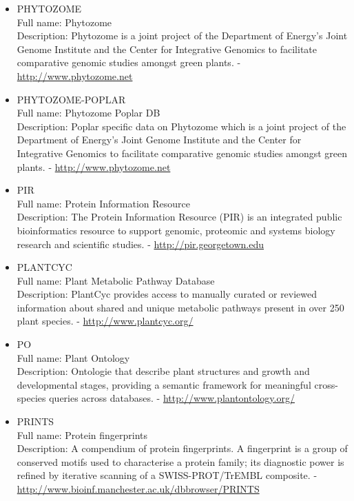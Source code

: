 \begin{itemize}
\item{PHYTOZOME}\\ Full name: Phytozome\\ Description: Phytozome is a joint project of the Department of Energy's Joint Genome Institute and the Center for Integrative Genomics to facilitate comparative genomic studies amongst green plants. - 
\url{http://www.phytozome.net}

\item{PHYTOZOME-POPLAR}\\ Full name: Phytozome Poplar DB\\ Description: Poplar specific data on Phytozome which is a joint project of the Department of Energy's Joint Genome Institute and the Center for Integrative Genomics to facilitate comparative genomic studies amongst green plants. - 
\url{http://www.phytozome.net}

\item{PIR}\\ Full name: Protein Information Resource\\ Description: The Protein Information Resource (PIR) is an integrated public bioinformatics resource to support genomic, proteomic and systems biology research and scientific studies. - 
\url{http://pir.georgetown.edu}

\item{PLANTCYC}\\ Full name: Plant Metabolic Pathway Database\\ Description: PlantCyc provides access to manually curated or reviewed information about shared and unique metabolic pathways present in over 250 plant species. - 
\url{http://www.plantcyc.org/}

\item{PO}\\ Full name: Plant Ontology\\ Description: Ontologie that describe plant structures and growth and developmental stages, providing a semantic framework for meaningful cross-species queries across databases. - 
\url{http://www.plantontology.org/}

\item{PRINTS}\\ Full name: Protein fingerprints\\ Description: A compendium of protein fingerprints. A fingerprint is a group of conserved motifs used to characterise a protein family; its diagnostic power is refined by iterative scanning of a SWISS-PROT/TrEMBL composite. - 
\url{http://www.bioinf.manchester.ac.uk/dbbrowser/PRINTS}


\end{itemize}
